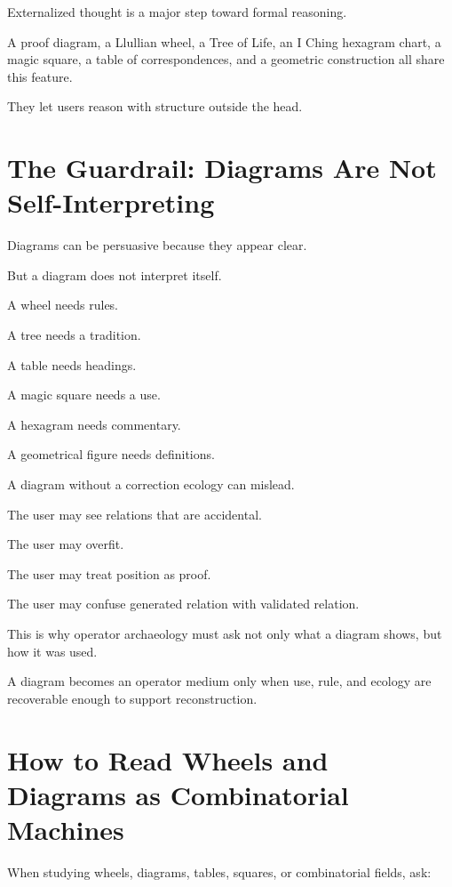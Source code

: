 \documentclass[11pt]{book}
\begin{document}
Externalized thought is a major step toward formal reasoning.

A proof diagram, a Llullian wheel, a Tree of Life, an I Ching hexagram chart, a magic square, a table of correspondences, and a geometric construction all share this feature.

They let users reason with structure outside the head.

\section{The Guardrail: Diagrams Are Not Self-Interpreting}

Diagrams can be persuasive because they appear clear.

But a diagram does not interpret itself.

A wheel needs rules.

A tree needs a tradition.

A table needs headings.

A magic square needs a use.

A hexagram needs commentary.

A geometrical figure needs definitions.

A diagram without a correction ecology can mislead.

The user may see relations that are accidental.

The user may overfit.

The user may treat position as proof.

The user may confuse generated relation with validated relation.

This is why operator archaeology must ask not only what a diagram shows, but how it was used.

A diagram becomes an operator medium only when use, rule, and ecology are recoverable enough to support reconstruction.

\section{How to Read Wheels and Diagrams as Combinatorial Machines}

When studying wheels, diagrams, tables, squares, or combinatorial fields, ask:
\end{document}
